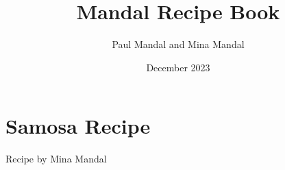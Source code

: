 \documentclass{article}
\title{Mandal Recipe Book}
\author{Paul Mandal and Mina Mandal}
\date{December 2023}
\begin{document}
\maketitle

\newpage

\tableofcontents

\newpage

\section{Samosa Recipe}
Recipe by Mina Mandal


\end{document}

